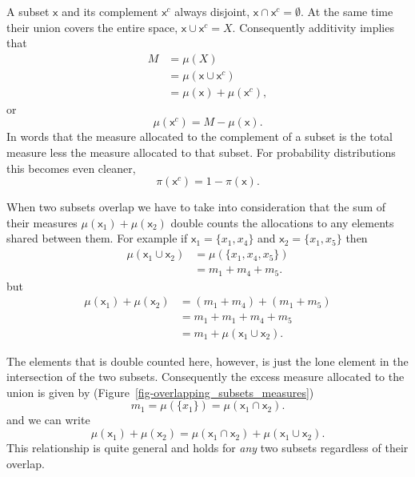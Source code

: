 \documentclass[
  letterpaper,
  DIV=11,
  numbers=noendperiod]{scrartcl}
\begin{document}
A subset \(\mathsf{x}\) and its complement \(\mathsf{x}^{c}\) always
disjoint, \(\mathsf{x} \cap \mathsf{x}^{c} = \emptyset\). At the same
time their union covers the entire space,
\(\mathsf{x} \cup \mathsf{x}^{c} = X\). Consequently additivity implies
that \begin{align*}
M
&=
\mu (X)
\\
&=
\mu ( \mathsf{x} \cup \mathsf{x}^{c} )
\\
&= \mu ( \mathsf{x} ) + \mu ( \mathsf{x}^{c} ),
\end{align*} or \[
\mu ( \mathsf{x}^{c} ) = M - \mu ( \mathsf{x} ).
\] In words that the measure allocated to the complement of a subset is
the total measure less the measure allocated to that subset. For
probability distributions this becomes even cleaner, \[
\pi ( \mathsf{x}^{c} ) = 1 - \pi ( \mathsf{x} ).
\]

When two subsets overlap we have to take into consideration that the sum
of their measures \(\mu ( \mathsf{x}_{1} ) + \mu ( \mathsf{x}_{2} )\)
double counts the allocations to any elements shared between them. For
example if \(\mathsf{x}_{1} = \{ x_{1}, x_{4} \}\) and
\(\mathsf{x}_{2} = \{ x_{1}, x_{5} \}\) then \begin{align*}
\mu( \mathsf{x}_{1} \cup \mathsf{x}_{2} )
&=
\mu( \{ x_{1}, x_{4}, x_{5} \} )
\\
&=
m_{1} + m_{4} + m_{5}.
\end{align*} but \begin{align*}
\mu( \mathsf{x}_{1} ) + \mu ( \mathsf{x}_{2} )
&=
(m_{1} + m_{4} ) + ( m_{1} + m_{5} )
\\
&=
m_{1} + m_{1} + m_{4} + m_{5}
\\
&=
m_{1} + \mu( \mathsf{x}_{1} \cup \mathsf{x}_{2} ).
\end{align*}

The elements that is double counted here, however, is just the lone
element in the intersection of the two subsets. Consequently the excess
measure allocated to the union is given by
(Figure~\ref{fig-overlapping_subsets_measures}) \[
m_{1} = \mu( \{ x_{1} \} ) = \mu( \mathsf{x}_{1} \cap \mathsf{x}_{2} ).
\] and we can write \[
\mu( \mathsf{x}_{1} ) + \mu ( \mathsf{x}_{2} )
=
  \mu( \mathsf{x}_{1} \cap \mathsf{x}_{2} )
+ \mu( \mathsf{x}_{1} \cup \mathsf{x}_{2} ).
\] This relationship is quite general and holds for \emph{any} two
subsets regardless of their overlap.
\end{document}
